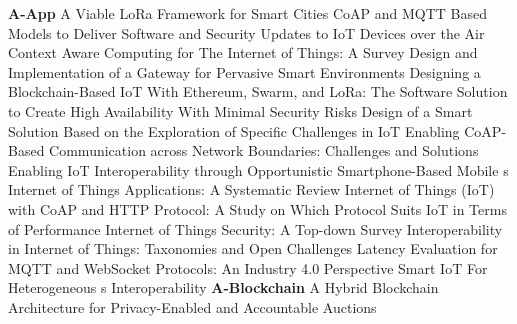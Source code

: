 
\onecolumn

\textbf{A-App} \newline  \cite{chen_viable_2018} A {{Viable LoRa Framework}} for {{Smart Cities}} \newline 
 \cite{thantharate_coap_2019} {{CoAP}} and {{MQTT Based Models}} to {{Deliver Software}} and {{Security Updates}} to {{IoT Devices}} over the {{Air}} \newline 
 \cite{perera_context_2014} Context {{Aware Computing}} for {{The Internet}} of {{Things}}: {{A Survey}} \newline 
 \cite{yacchirema_design_2016} Design and Implementation of a {{Gateway}} for {{Pervasive Smart Environments}} \newline 
 \cite{ozyilmaz_designing_2019} Designing a {{Blockchain}}-{{Based IoT With Ethereum}}, {{Swarm}}, and {{LoRa}}: {{The Software Solution}} to {{Create High Availability With Minimal Security Risks}} \newline 
 \cite{venkatesan_design_2017} Design of a Smart  Solution Based on the Exploration of Specific Challenges in {{IoT}} \newline 
 \cite{novo_enabling_2019} Enabling {{CoAP}}-{{Based Communication}} across {{Network Boundaries}}: {{Challenges}} and {{Solutions}} \newline 
 \cite{aloi_enabling_2017} Enabling {{IoT}} Interoperability through Opportunistic Smartphone-Based Mobile s \newline 
 \cite{asghari_internet_2019} Internet of {{Things}} Applications: {{A}} Systematic Review \newline 
 \cite{phon-amnuaisuk_internet_2017} Internet of {{Things}} ({{IoT}}) with {{CoAP}} and {{HTTP Protocol}}: {{A Study}} on {{Which Protocol Suits IoT}} in {{Terms}} of {{Performance}} \newline 
 \cite{kouicem_internet_2018} Internet of Things Security: {{A}} Top-down Survey \newline 
 \cite{noura_interoperability_2018} Interoperability in {{Internet}} of {{Things}}: {{Taxonomies}} and {{Open Challenges}} \newline 
 \cite{silva_latency_2018} Latency Evaluation for {{MQTT}} and {{WebSocket Protocols}}: An {{Industry}} 4.0 Perspective \newline 
 \cite{yacchirema_vargas_smart_2016} Smart {{IoT  For Heterogeneous s Interoperability}} \newline 
\textbf{A-Blockchain} \newline  \cite{desai_hybrid_2019} A {{Hybrid Blockchain Architecture}} for {{Privacy}}-{{Enabled}} and {{Accountable Auctions}} \newline 
